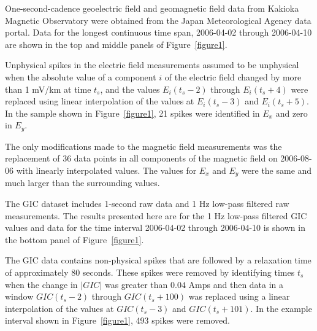 \documentclass[draft,linenumbers]{agujournal2018}
\begin{document}
One-second-cadence geoelectric field and geomagnetic field data from Kakioka Magnetic Observatory were obtained from the Japan Meteorological Agency data portal. Data for the longest continuous time span, 2006-04-02 through 2006-04-10 are shown in the top and middle panels of Figure~\ref{figure1}.

Unphysical spikes in the electric field measurements assumed to be unphysical when the absolute value of a component $i$ of the electric field changed by more than 1 mV/km at time $t_s$, and the values $E_i(t_s-2)$ through $E_i(t_s+4)$ were replaced using linear interpolation of the values at $E_i(t_s-3)$ and $E_i(t_s + 5)$. In the sample shown in Figure~\ref{figure1}, 21 spikes were identified in $E_x$ and zero in $E_y$.

The only modifications made to the magnetic field measurements was the replacement of 36 data points in all components of the magnetic field on 2006-08-06 with linearly interpolated values. The values for $E_x$ and $E_y$ were the same and much larger than the surrounding values.

The GIC dataset includes 1-second raw data and 1 Hz low-pass filtered raw measurements.  The results presented here are for the 1 Hz low-pass filtered GIC values and data for the time interval 2006-04-02 through 2006-04-10 is shown in the bottom panel of Figure~\ref{figure1}.

The GIC data contains non-physical spikes that are followed by a relaxation time of approximately 80 seconds. These spikes were removed by identifying times $t_s$ when the change in $|GIC|$ was greater than $0.04$ Amps and then data in a window $GIC(t_s-2)$ through $GIC(t_s+100)$ was replaced using a linear interpolation of the values at $GIC(t_s-3)$ and $GIC(t_s + 101)$. In the example interval shown in Figure~\ref{figure1}, 493 spikes were removed.
\end{document}
